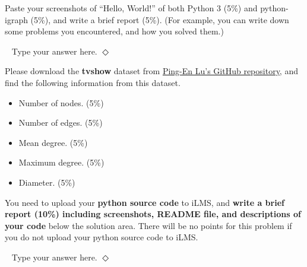 \documentclass[12pt]{article}
\newcommand {\bsolution}{\noindent {\em Solution:} \ }
\newcommand{\esolution}{\hfill $\Diamond$ \\ \vspace{.3cm}}
\begin{document}
Paste your screenshots of “Hello, World!” of both Python 3 (5\%) and python-igraph (5\%), and write a brief report (5\%). (For example, you can write down some problems you encountered, and how you solved them.)

\bsolution
Type your answer here.
\esolution

Please download the {\bf tvshow} dataset from \href{https://github.com/PingEnLu/Network-Science-COM530500/tree/master/Network_Science_Python_iGraph_Tutorial}{Ping-En Lu's GitHub repository}, and find the following information from this dataset.

\begin{itemize}
	\item Number of nodes. (5\%)
	\item Number of edges. (5\%)
	\item Mean degree. (5\%)
	\item Maximum degree. (5\%)
	\item Diameter. (5\%)
\end{itemize}
You need to upload your {\bf python source code} to iLMS, and {\bf write a brief report (10\%) including screenshots, README file, and descriptions of your code} below the solution area. There will be no points for this problem if you do not upload your python source code to iLMS.

\bsolution
Type your answer here.
\esolution

\end{document}
